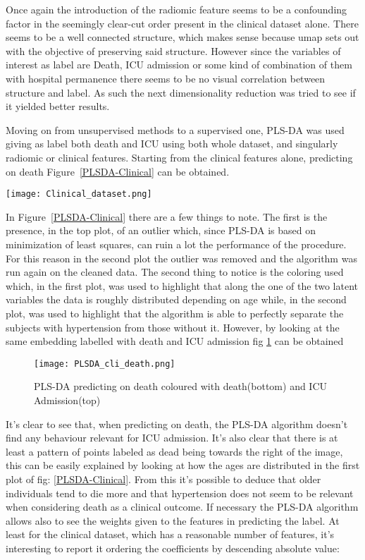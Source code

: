 Once again the introduction of the radiomic feature seems to be a confounding factor in the seemingly clear-cut order present in the clinical dataset alone.
There seems to be a well connected structure, which makes sense because umap sets out with the objective of preserving said structure.
However since the variables of interest as label are Death, ICU admission or some kind of combination of them with hospital permanence there seems to be no visual correlation between structure and label.
As such the next dimensionality reduction was tried to see if it yielded better results.
 
Moving on from unsupervised methods to a supervised one, PLS-DA was used giving as label both death and ICU using both whole dataset, and singularly radiomic or clinical features. 
Starting from the clinical features alone, predicting on death Figure~\ref{PLSDA-Clinical} can be obtained.

\begin{figure*}[htbp]
  		\texttt{[image: Clinical\_dataset.png]}
          \caption{PLS-DA predicting on death coloured with age and hypertension\label{PLSDA-Clinical}}
\end{figure*}

In Figure~\ref{PLSDA-Clinical} there are a few things to note. 
The first is the presence, in the top plot, of an outlier which, since PLS-DA is based on minimization of least squares, can ruin a lot the performance of the procedure. 
For this reason in the second plot the outlier was removed and the algorithm was run again on the cleaned data.
The second thing to notice is the coloring used which, in the first plot, was used to highlight that along the one of the two latent variables the data is roughly distributed depending on age while, in the second plot, was used to highlight that the algorithm is able to perfectly separate the subjects with hypertension from those without it.
However, by looking at the same embedding labelled with death and ICU admission fig \ref{PLSDA-Clinical-death} can be obtained

\begin{figure}[htbp]
  		\texttt{[image: PLSDA\_cli\_death.png]}
          \caption{PLS-DA predicting on death coloured with death(bottom) and ICU Admission(top)\label{PLSDA-Clinical-death}}
\end{figure}

It's clear to see that, when predicting on death, the PLS-DA algorithm doesn't find any behaviour relevant for ICU admission.
It's also clear that there is at least a pattern of points labeled as dead being towards the right of the image, this can be easily explained by looking at how the ages are distributed in the first plot of fig: \ref{PLSDA-Clinical}. 
From this it's possible to deduce that older individuals tend to die more and that hypertension does not seem to be relevant when considering death as a clinical outcome.
If necessary the PLS-DA algorithm allows also to see the weights given to the features in predicting the label. At least for the clinical dataset, which has a reasonable number of features, it's interesting to report it ordering the coefficients by descending absolute value: 

